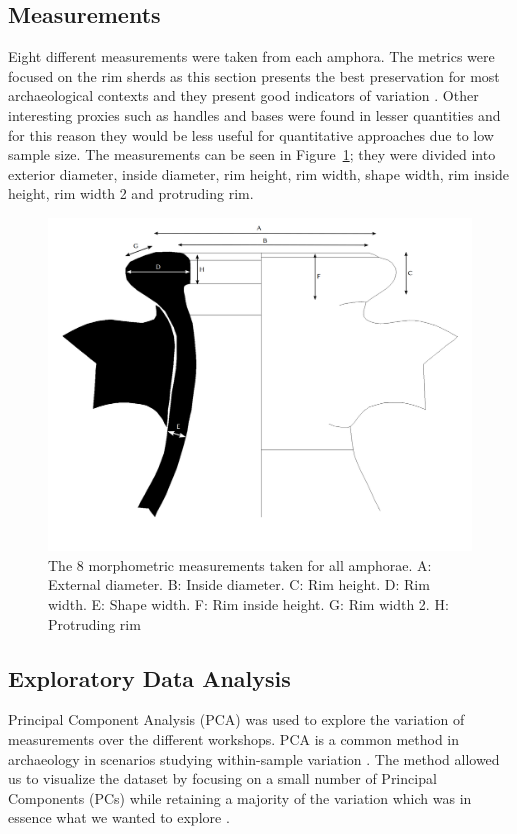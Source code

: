 \documentclass[review]{elsarticle}
\begin{document}
\subsection{Measurements}

Eight different measurements were taken from each amphora. The metrics were focused on the rim sherds as this section presents the best preservation for most archaeological contexts and they present good indicators of variation \citep{berni_millet_epigrafianforica_2008}. Other interesting proxies such as handles and bases were found in lesser quantities and for this reason they would be less useful for quantitative approaches due to low sample size. The measurements can be seen in Figure~\ref{mesures}; they were divided into exterior diameter, inside diameter, rim height, rim width, shape width, rim inside height, rim width 2 and protruding rim.

\begin{figure}[htp]
	\centering
\includegraphics[width=\linewidth]{figs/mesures.png}
\caption{The 8 morphometric measurements taken for all amphorae. A: External diameter. B: Inside diameter. C: Rim height. D: Rim width. E: Shape width. F: Rim inside height. G: Rim width 2. H: Protruding rim}
\label{mesures}
\end{figure} 

\subsection{Exploratory Data Analysis}

Principal Component Analysis (PCA) was used to explore the variation of measurements over the different workshops. PCA is a common method in archaeology in scenarios studying within-sample variation \citep{ shennan_quantifying_1997, li_crossbows_2014, schillinger_differences_2016}. The method allowed us to visualize the dataset by focusing on a small number of Principal Components (PCs) while retaining a majority of the variation which was in essence what we wanted to explore \citep{jolliffe_principal_2002}. 
\end{document}
